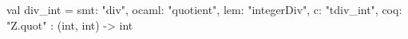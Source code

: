 val div_int = {
  smt: "div",
  ocaml: "quotient",
  lem: "integerDiv",
  c: "tdiv_int",
  coq: "Z.quot"
} : (int, int) -> int
